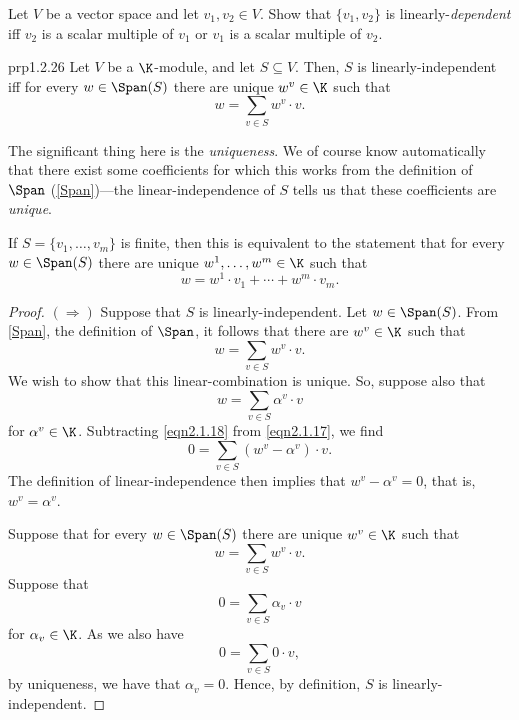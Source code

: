 \begin{exr}{}{}
	Let $V$ be a vector space and let $v_1,v_2\in V$.  Show that $\{ v_1,v_2\}$ is linearly-\emph{dependent} iff $v_2$ is a scalar multiple of $v_1$ or $v_1$ is a scalar multiple of $v_2$.
\end{exr}
\begin{prp}{}{prp1.2.26}
	Let $V$ be a $\K$-module, and let $S\subseteq V$.  Then, $S$ is linearly-independent iff for every $w\in \Span (S)$ there are unique $w^v\in \K$ such that
	\begin{equation}
		w=\sum _{v\in S}w^v\cdot v.
	\end{equation}
	\begin{rmk}
		The significant thing here is the \emph{uniqueness}.  We of course know automatically that there exist some coefficients for which this works from the definition of $\Span$ (\cref{Span})---the linear-independence of $S$ tells us that these coefficients are \emph{unique}.
	\end{rmk}
	\begin{rmk}
		If $S=\{ v_1,\ldots ,v_m\}$ is finite, then this is equivalent to the statement that for every $w\in \Span (S)$ there are unique $w^1,\ldots ,w^m\in \K$ such that
		\begin{equation}
			w=w^1\cdot v_1+\cdots +w^m\cdot v_m.
		\end{equation}
	\end{rmk}
	\begin{proof}
		$(\Rightarrow )$ Suppose that $S$ is linearly-independent.  Let $w\in \Span (S)$.  From \cref{Span}, the definition of $\Span$, it follows that there are $w^v\in \K$ such that
		\begin{equation}\label{eqn2.1.17}
			w=\sum _{v\in S}w^v\cdot v.
		\end{equation}
		We wish to show that this linear-combination is unique.  So, suppose also that
		\begin{equation}\label{eqn2.1.18}
			w=\sum _{v\in S}\alpha ^v\cdot v
		\end{equation}
		for $\alpha ^v\in \K$.  Subtracting \eqref{eqn2.1.18} from \eqref{eqn2.1.17}, we find
		\begin{equation}
			0=\sum _{v\in S}(w^v-\alpha ^v)\cdot v.
		\end{equation}
		The definition of linear-independence then implies that $w^v-\alpha ^v=0$, that is, $w^v=\alpha ^v$.
		
		\blni
		Suppose that for every $w\in \Span (S)$ there are unique $w^v\in \K$ such that
		\begin{equation}
		w=\sum _{v\in S}w^v\cdot v.
		\end{equation}
		Suppose that
		\begin{equation}
			0=\sum _{v\in S}\alpha _v\cdot v
		\end{equation}
		for $\alpha _v\in \K$.  As we also have
		\begin{equation}
			0=\sum _{v\in S}0\cdot v,
		\end{equation}
		by uniqueness, we have that $\alpha _v=0$.  Hence, by definition, $S$ is linearly-independent.
	\end{proof}
\end{prp}
